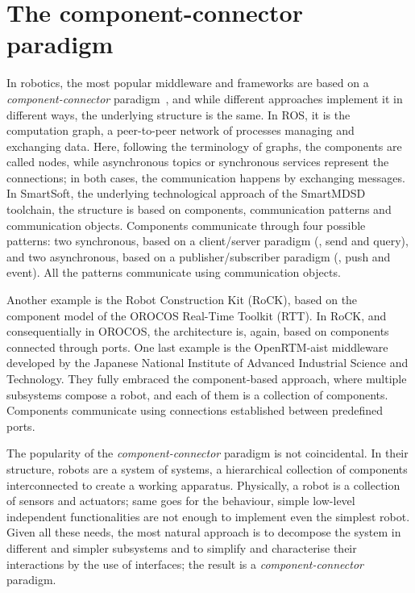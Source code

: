 
\minitoc
\newpage

\section[The component-connector paradigm]{The component-connector \\paradigm}
\label{sec:cnc}
In robotics, the most popular middleware and frameworks are based on a \textit{component-connector} paradigm~\cite{shakhimardanov2010component}, and while different approaches implement it in different ways, the underlying structure is the same. In ROS, it is the computation graph, a peer-to-peer network of processes managing and exchanging data. Here, following the terminology of graphs, the components are called nodes, while asynchronous topics or synchronous services represent the connections; in both cases, the communication happens by exchanging messages. In SmartSoft, the underlying technological approach of the SmartMDSD toolchain, the structure is based on components, communication patterns and communication objects. Components communicate through four possible patterns: two synchronous, based on a client/server paradigm (\ie, send and query), and two asynchronous, based on a publisher/subscriber paradigm (\ie, push and event). All the patterns communicate using communication objects.

Another example is the Robot Construction Kit (RoCK), based on the component model of the OROCOS Real-Time Toolkit (RTT). In RoCK, and consequentially in OROCOS, the architecture is, again, based on components connected through ports. One last example is the OpenRTM-aist middleware developed by the Japanese National Institute of Advanced Industrial Science and Technology. They fully embraced the component-based approach, where multiple subsystems compose a robot, and each of them is a collection of components. Components communicate using connections established between predefined ports.

The popularity of the \textit{component-connector} paradigm is not coincidental. In their structure, robots are a system of systems, a hierarchical collection of components interconnected to create a working apparatus. Physically, a robot is a collection of sensors and actuators; same goes for the behaviour, simple low-level independent functionalities are not enough to implement even the simplest robot. Given all these needs, the most natural approach is to decompose the system in different and simpler subsystems and to simplify and characterise their interactions by the use of interfaces; the result is a \textit{component-connector} paradigm.

